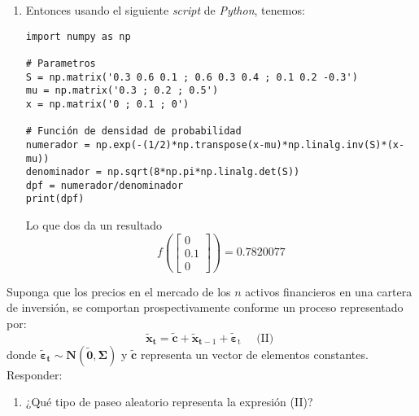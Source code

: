 \begin{problema}
\begin{enumerate}
\begin{sol}
\begin{enumerate}
\begin{enumerate}
\begin{align*}
\begin{bmatrix}
                        0.3\\
                    0.2\\
                    0.5
                    \end{bmatrix}
                \intertext{Por medio de cofactores:}
                |\Sigma|&= 0.0899
                \intertext{La matriz inversa: }
                \Sigma^{-1} &=  \begin{bmatrix}
                    0.3 & 0.6 & 0.1\\
                    0.6 & 0.3 & 0.4\\
                    0.1 & 0.4 & -0.3
                \end{bmatrix}^{-1}
                \end{align*}
                \item Entonces usando el siguiente \textit{script} de \textit{Python}, tenemos: 
                \begin{verbatim}
import numpy as np

# Parametros
S = np.matrix('0.3 0.6 0.1 ; 0.6 0.3 0.4 ; 0.1 0.2 -0.3')
mu = np.matrix('0.3 ; 0.2 ; 0.5')
x = np.matrix('0 ; 0.1 ; 0')

# Función de densidad de probabilidad
numerador = np.exp(-(1/2)*np.transpose(x-mu)*np.linalg.inv(S)*(x-mu))
denominador = np.sqrt(8*np.pi*np.linalg.det(S))
dpf = numerador/denominador 
print(dpf)
                \end{verbatim}
                Lo que dos da un resultado 
                $$f\left(\begin{bmatrix}
                    0\\
                    0.1\\
                    0
                \end{bmatrix}\right)= 0.7820077$$
            \end{enumerate}
        \end{enumerate}
    \end{sol}
\end{enumerate}
Suponga que los precios en el mercado de los $n$ activos financieros en una cartera de inversión, se comportan prospectivamente conforme un proceso representado por:
$$
\tilde{\boldsymbol{x}}_{\mathbf{t}}=\tilde{\boldsymbol{c}}+\tilde{\boldsymbol{x}}_{\mathbf{t}-1}+\tilde{\boldsymbol{\varepsilon}}_{\mathrm{t}} \quad \text { (II) }
$$
donde $\tilde{\boldsymbol{\varepsilon}}_{\mathbf{t}} \sim \mathbf{N}(\tilde{\mathbf{0}}, \boldsymbol{\Sigma})$ y $\tilde{\boldsymbol{c}}$ representa un vector de elementos constantes.
Responder: 
\begin{enumerate}
    \item ¿Qué tipo de paseo aleatorio representa la expresión (II)?
    \begin{sol}


\end{sol}
\end{enumerate}
\end{problema}
